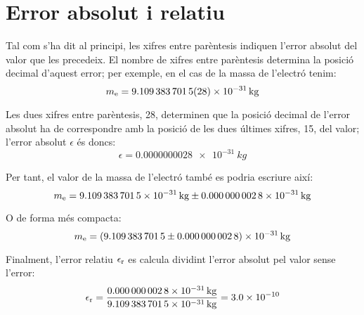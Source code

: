  
   
  
  
  
  
  
 \index{$\sigma$}  


\section{Error absolut i relatiu}\label{err_abs_rel}

Tal com s'ha dit al principi, les xifres entre parèntesis indiquen l'error absolut del valor que les precedeix. El nombre de xifres entre parèntesis determina la posició decimal d'aquest error; per exemple, en el cas de la  massa de l'electró tenim:
\[
    m_\mathrm{e} = \qty{9,109 383 7015(28) e-31}{kg}
\]

Les dues xifres entre parèntesis, 28, determinen que la posició decimal de l'error absolut ha de correspondre amb la posició de les dues últimes xifres, 15, del valor; l'error absolut $\epsilon$  és doncs:
\[
    \epsilon = \qty{0,000 000 0028 e-31}{kg}
\]

Per tant, el valor de la massa de l'electró també es podria escriure així:
 \[
    m\ped{e} = \qty[separate-uncertainty,separate-uncertainty-units = repeat]{9,109 383 7015(28) e-31}{kg}
\]

O de forma més compacta:
\[
m\ped{e} = \qty[separate-uncertainty,separate-uncertainty-units = bracket]{9,109 383 7015(28) e-31}{kg}
\]

Finalment, l'error relatiu $\epsilon_\mathrm{r}$ es calcula dividint l'error absolut pel valor sense l'error:
\[
    \epsilon_\mathrm{r} = \frac{\qty{0,000 000 0028 e-31}{kg}}{\qty{9,109 383 7015 e-31}{kg}} =   \num{3,0e-10}
\]
